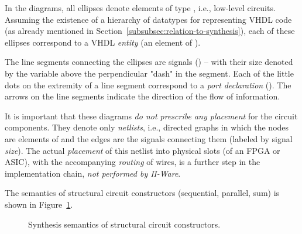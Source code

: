             In the diagrams, all ellipses denote elements of type , i.e., low-level circuits.
            Assuming the existence of a hierarchy of datatypes for representing \ac{VHDL} code
            (as already mentioned in Section~\ref{subsubsec:relation-to-synthesis}),
            each of these ellipses correspond to a \ac{VHDL} \emph{entity} (an element of ).

            The line segments connecting the ellipses are signals () – with their size
            denoted by the variable above the perpendicular "dash" in the segment.
            Each of the little dots on the extremity of a line segment correspond to a \emph{port declaration}
            (). The arrows on the line segments indicate the direction of the flow of information.

            It is important that these diagrams \emph{do not prescribe any placement} for the circuit components.
            They denote only \emph{netlists}, i.e., directed graphs in which the nodes are elements of 
            and the edges are the signals connecting them (labeled by signal \emph{size}).
            The actual \emph{placement} of this netlist into physical slots (of an \ac{FPGA} or \ac{ASIC}),
            with the accompanying \emph{routing} of wires, is a further step in the implementation chain,
            \emph{not performed by Π-Ware}.

            The semantics of structural circuit constructors (sequential, parallel, sum) is
            shown in Figure~\ref{fig:semantics-syn-structural}.

            \begin{figure}[h]
                \caption{Synthesis semantics of structural circuit constructors.\label{fig:semantics-syn-structural}}
            \end{figure}

